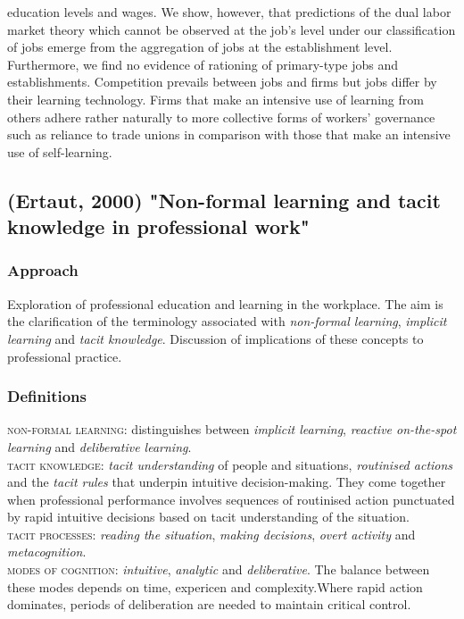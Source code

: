 \documentclass[12pt,a4paper]{article}
\begin{document}
  education levels and wages. We show, however, that predictions of the dual labor market theory which
  cannot be observed at the job’s level under our classification of jobs emerge from the aggregation
  of jobs at the establishment level. Furthermore, we find no evidence of rationing of primary-type
  jobs and establishments. Competition prevails between jobs and firms but jobs differ by their
  learning technology. Firms that make an intensive use of learning from others adhere rather
  naturally to more collective forms of workers’ governance such as reliance to trade unions in
  comparison with those that make an intensive use of self-learning.

  \subsection{(Ertaut, 2000) "Non-formal learning and tacit knowledge in professional work"} %
  \label{sec:(Ertaut, 2000}
    \subsubsection{Approach}
      Exploration of professional education and learning in the workplace. The aim is the clarification of the terminology associated with \emph{non-formal learning}, \emph{implicit learning} and \emph{tacit knowledge}. Discussion of implications of these concepts to professional practice.

    \subsubsection{Definitions}
      \textsc{non-formal learning}: distinguishes between \emph{implicit learning}, \emph{reactive on-the-spot learning} and \emph{deliberative learning}. \\
      \textsc{tacit knowledge}: \emph{tacit understanding} of people and situations, \emph{routinised actions} and the \emph{tacit rules} that underpin intuitive decision-making. They come together when professional performance involves sequences of routinised action punctuated by rapid intuitive decisions based on tacit understanding of the situation. \\
      \textsc{tacit processes}: \emph{reading the situation}, \emph{making decisions}, \emph{overt activity} and \emph{metacognition}.\\
      \textsc{modes of cognition}: \emph{intuitive}, \emph{analytic} and \emph{deliberative}. The balance between these modes depends on time, expericen and complexity.Where rapid action dominates, periods of deliberation are needed to maintain critical control.
\end{document}
